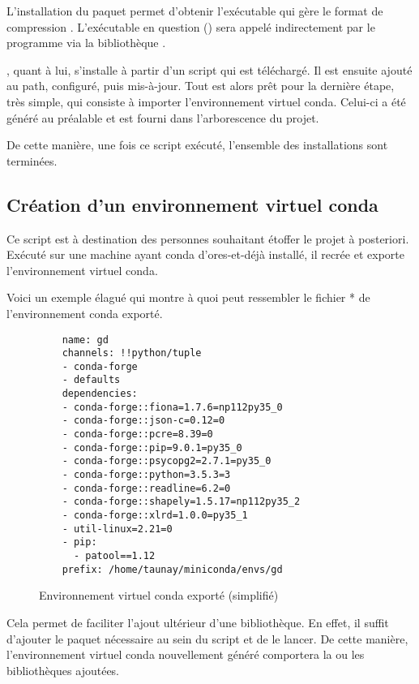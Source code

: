 L'installation du paquet  permet d'obtenir l'exécutable qui gère le format de compression . L'exécutable en question () sera appelé indirectement par le programme via la bibliothèque .

, quant à lui, s'installe à partir d'un script qui est téléchargé. Il est ensuite ajouté au path, configuré, puis mis-à-jour. Tout est alors prêt pour la dernière étape, très simple, qui consiste à importer l'environnement virtuel conda. Celui-ci a été généré au préalable et est fourni dans l'arborescence du projet.

De cette manière, une fois ce script exécuté, l'ensemble des installations sont terminées.

  \subsection{Création d'un environnement virtuel conda}

Ce script est à destination des personnes souhaitant étoffer le projet à posteriori. Exécuté sur une machine ayant conda d'ores-et-déjà installé, il recrée et exporte l'environnement virtuel conda.

Voici un exemple élagué qui montre à quoi peut ressembler le fichier * de l'environnement conda exporté.

\begin{figure}
\centering
  \begin{lstlisting}
    name: gd
    channels: !!python/tuple
    - conda-forge
    - defaults
    dependencies:
    - conda-forge::fiona=1.7.6=np112py35_0
    - conda-forge::json-c=0.12=0
    - conda-forge::pcre=8.39=0
    - conda-forge::pip=9.0.1=py35_0
    - conda-forge::psycopg2=2.7.1=py35_0
    - conda-forge::python=3.5.3=3
    - conda-forge::readline=6.2=0
    - conda-forge::shapely=1.5.17=np112py35_2
    - conda-forge::xlrd=1.0.0=py35_1
    - util-linux=2.21=0
    - pip:
      - patool==1.12
    prefix: /home/taunay/miniconda/envs/gd
  \end{lstlisting}
\caption{Environnement virtuel conda exporté (simplifié)}
\end{figure}

Cela permet de faciliter l'ajout ultérieur d'une bibliothèque. En effet, il suffit d'ajouter le paquet nécessaire au sein du script et de le lancer. De cette manière, l'environnement virtuel conda nouvellement généré comportera la ou les bibliothèques ajoutées.
